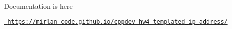 Documentation is here

\href{https://mirlan-code.github.io/cppdev-hw4-templated_ip_address/}{\texttt{ https\+://mirlan-\/code.\+github.\+io/cppdev-\/hw4-\/templated\+\_\+ip\+\_\+address/}} 